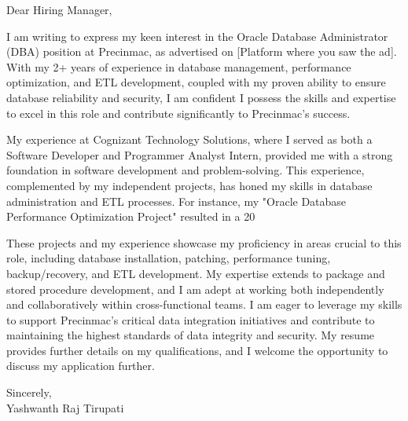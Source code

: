 \documentclass[letterpaper,11pt]{article}
\begin{document}
\begin{flushleft}
Dear Hiring Manager,

\vspace{12pt}

I am writing to express my keen interest in the Oracle Database Administrator (DBA) position at Precinmac, as advertised on [Platform where you saw the ad].  With my 2+ years of experience in database management, performance optimization, and ETL development, coupled with my proven ability to ensure database reliability and security, I am confident I possess the skills and expertise to excel in this role and contribute significantly to Precinmac's success.

\vspace{12pt}

My experience at Cognizant Technology Solutions, where I served as both a Software Developer and Programmer Analyst Intern, provided me with a strong foundation in software development and problem-solving.  This experience, complemented by my independent projects, has honed my skills in database administration and ETL processes.  For instance, my "Oracle Database Performance Optimization Project" resulted in a 20%

\vspace{12pt}

These projects and my experience showcase my proficiency in areas crucial to this role, including database installation, patching, performance tuning, backup/recovery, and ETL development. My expertise extends to package and stored procedure development, and I am adept at working both independently and collaboratively within cross-functional teams.  I am eager to leverage my skills to support Precinmac's critical data integration initiatives and contribute to maintaining the highest standards of data integrity and security. My resume provides further details on my qualifications, and I welcome the opportunity to discuss my application further.

\vspace{20pt}

Sincerely, \\
Yashwanth Raj Tirupati

\end{flushleft}
\end{document}
